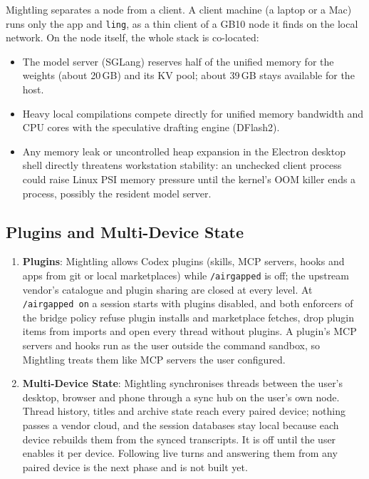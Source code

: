 \documentclass[11pt]{article}
\newcommand{\code}[1]{\texttt{#1}}
\newcommand{\agon}{\code{/airgapped on}}
\begin{document}
Mightling separates a node from a client. A client machine (a laptop or a Mac) runs only the app and \code{ling}, as
a thin client of a GB10 node it finds on the local network. On the node itself, the whole stack is co-located:
\begin{itemize}
    \item The model server (SGLang) reserves half of the unified memory for the weights (about 20\,GB) and its KV pool;
    about 39\,GB stays available for the host.
    \item Heavy local compilations compete directly for unified memory bandwidth and CPU cores with the speculative
    drafting engine (DFlash2).
    \item Any memory leak or uncontrolled heap expansion in the Electron desktop shell directly threatens workstation
    stability: an unchecked client process could raise Linux PSI memory pressure until the kernel's OOM killer ends a
    process, possibly the resident model server.
\end{itemize}

\subsection{Plugins and Multi-Device State}

\begin{enumerate}
    \item \textbf{Plugins}: Mightling allows Codex plugins (skills, MCP servers, hooks and apps from git or local
    marketplaces) while \code{/airgapped} is off; the upstream vendor's catalogue and plugin sharing are closed at every
    level. At \agon{} a session starts with plugins disabled, and both enforcers of the bridge policy refuse plugin
    installs and marketplace fetches, drop plugin items from imports and open every thread without plugins. A plugin's
    MCP servers and hooks run as the user outside the command sandbox, so Mightling treats them like MCP servers the
    user configured.
    \item \textbf{Multi-Device State}: Mightling synchronises threads between the user's desktop, browser and phone
    through a sync hub on the user's own node. Thread history, titles and archive state reach every paired device;
    nothing passes a vendor cloud, and the session databases stay local because each device rebuilds them from the
    synced transcripts. It is off until the user enables it per device. Following live turns and answering them from
    any paired device is the next phase and is not built yet.
\end{enumerate}
\end{document}
